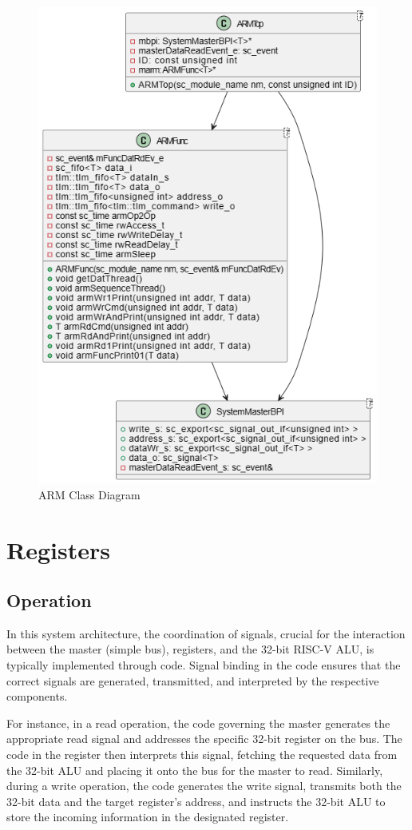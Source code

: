\documentclass[a4paper,12pt,english]{report}
\begin{document}
 \begin{figure}[h!]
  \centering
  \includegraphics[width=0.7\linewidth]{arm.drawio.png}
  \caption{ARM Class Diagram}
\end{figure}

\section{Registers}
\subsection{Operation}

In this system architecture, the coordination of signals, crucial for the interaction between the master (simple bus), registers, and the 32-bit RISC-V ALU, is typically implemented through code. Signal binding in the code ensures that the correct signals are generated, transmitted, and interpreted by the respective components.

For instance, in a read operation, the code governing the master generates the appropriate read signal and addresses the specific 32-bit register on the bus. The code in the register then interprets this signal, fetching the requested data from the 32-bit ALU and placing it onto the bus for the master to read. Similarly, during a write operation, the code generates the write signal, transmits both the 32-bit data and the target register's address, and instructs the 32-bit ALU to store the incoming information in the designated register.
\end{document}
